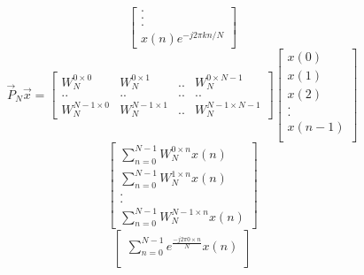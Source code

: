 \documentclass[journal,12pt,twocolumn]{IEEEtran}
\renewcommand\thesection{\arabic{section}}
\begin{document}
\begin{enumerate}[label=\arabic*.,ref=\thesection.\theenumi]
\begin{equation}
\begin{bmatrix}
                     .                        \\
                     .                        \\
                     .                        \\
                     x(n)e^{-j 2 \pi k n / N}
                \end{bmatrix}
           \end{equation}
           \begin{equation}
                \vec{P}_N \vec{x} =
                \begin{bmatrix}
                     W_N^{0\times0}     & W_N^{0\times1}     & .. & W_N^{0\times N-1}    \\
                     ..                 & ..                 & .. & ..                   \\
                     W_N^{N-1 \times 0} & W_N^{N-1 \times 1} & .. & W_N^{N-1 \times N-1}
                \end{bmatrix}
                \begin{bmatrix}
                     x(0)   \\
                     x(1)   \\
                     x(2)   \\
                     .      \\
                     .      \\
                     x(n-1) \\
                \end{bmatrix}
           \end{equation}
           \begin{equation}
                \begin{bmatrix}
                     \sum_{n=0}^{N-1}W_N^{0\times n} x(n) \\
                     \sum_{n=0}^{N-1}W_N^{1\times n} x(n) \\
                     .                                    \\
                     .                                    \\
                     \sum_{n=0}^{N-1}W_N^{N-1\times n} x(n)
                \end{bmatrix}
           \end{equation}
           \begin{equation}
                \begin{bmatrix}
                     \sum_{n=0}^{N-1}e^{\frac{-j2\pi0\times n}{N}} x(n) \\

\end{bmatrix}
\end{equation}
\end{enumerate}
\end{document}
